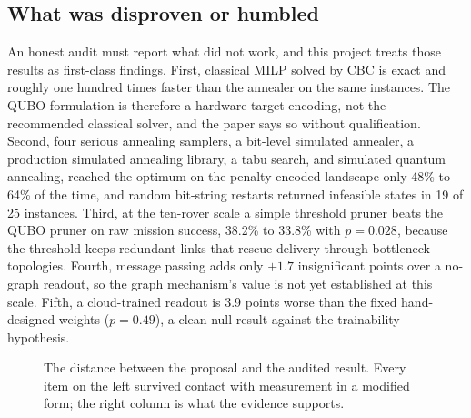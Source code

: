 \subsection{What was disproven or humbled}

An honest audit must report what did not work, and this project treats those
results as first-class findings. First, classical MILP solved by CBC is
exact and roughly one hundred times faster than the annealer on the same
instances. The QUBO formulation is therefore a hardware-target encoding, not
the recommended classical solver, and the paper says so without
qualification. Second, four serious annealing samplers, a bit-level
simulated annealer, a production simulated annealing library, a tabu search,
and simulated quantum annealing, reached the optimum on the penalty-encoded
landscape only 48\% to 64\% of the time, and random bit-string restarts
returned infeasible states in 19 of 25 instances. Third, at the ten-rover
scale a simple threshold pruner beats the QUBO pruner on raw mission
success, 38.2\% to 33.8\% with $p = 0.028$, because the threshold keeps
redundant links that rescue delivery through bottleneck topologies. Fourth,
message passing adds only $+1.7$ insignificant points over a no-graph
readout, so the graph mechanism's value is not yet established at this
scale. Fifth, a cloud-trained readout is 3.9 points worse than the fixed
hand-designed weights ($p = 0.49$), a clean null result against the
trainability hypothesis.

\begin{figure}[htbp]
\centering
{}
\caption{The distance between the proposal and the audited result. Every
item on the left survived contact with measurement in a modified form; the
right column is what the evidence supports.}
\label{fig:conclusion-audit}
\end{figure}

